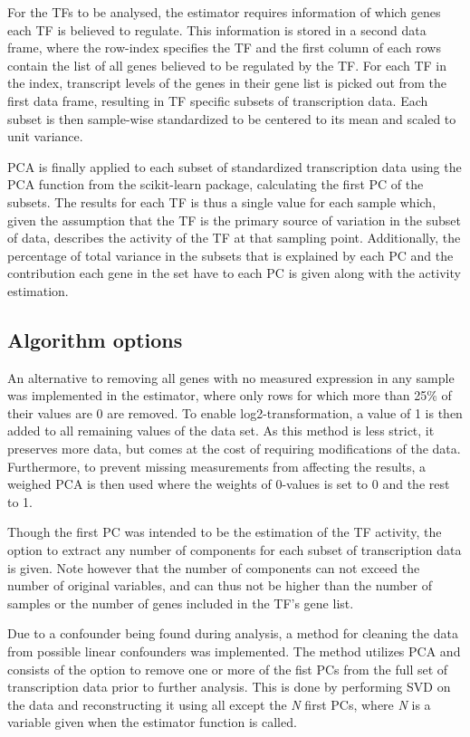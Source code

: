 For the \acp{TF} to be analysed, the estimator requires information of which genes each \ac{TF} is believed to regulate. This information is stored in a second data frame, where the row-index specifies the \ac{TF} and the first column of each rows contain the list of all genes believed to be regulated by the \ac{TF}. For each \ac{TF} in the index, transcript levels of the genes in their gene list is picked out from the first data frame, resulting in \ac{TF} specific subsets of transcription data. Each subset is then sample-wise standardized to be centered to its mean and scaled to unit variance.

\ac{PCA} is finally applied to each subset of standardized transcription data using the \ac{PCA} function from the scikit-learn package, calculating the first \ac{PC} of the subsets. The results for each \ac{TF} is thus a single value for each sample which, given the assumption that the \ac{TF} is the primary source of variation in the subset of data, describes the activity of the \ac{TF} at that sampling point. Additionally, the percentage of total variance in the subsets that is explained by each \ac{PC} and the contribution each gene in the set have to each \ac{PC} is given along with the activity estimation.
 
\subsection{Algorithm options}

An alternative to removing all genes with no measured expression in any sample was implemented in the estimator, where only rows for which more than 25\% of their values are 0 are removed. To enable log2-transformation, a value of 1 is then added to all remaining values of the data set. As this method is less strict, it preserves more data, but comes at the cost of requiring modifications of the data. Furthermore, to prevent missing measurements from affecting the results, a weighed \ac{PCA} \cite{wPCA} is then used where the weights of 0-values is set to 0 and the rest to 1.

Though the first \ac{PC} was intended to be the estimation of the \ac{TF} activity, the option to extract any number of components for each subset of transcription data is given. Note however that the number of components can not exceed the number of original variables, and can thus not be higher than the number of samples or the number of genes included in the \ac{TF}'s gene list.

Due to a confounder being found during analysis, a method for cleaning the data from possible linear confounders was implemented. The method utilizes \ac{PCA} and consists of the option to remove one or more of the fist \acp{PC} from the full set of transcription data prior to further analysis. This is done by performing \ac{SVD} on the data and reconstructing it using all except the \textit{N} first \acp{PC}, where \textit{N} is a variable given when the estimator function is called.

